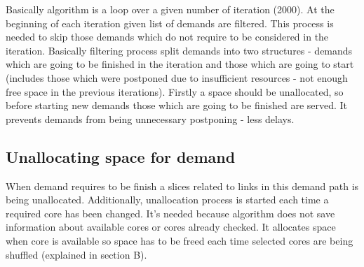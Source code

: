 \documentclass[conference]{IEEEtran}
\begin{document}
Basically algorithm is a loop over a given number of iteration (2000). At the beginning of each iteration given list of demands are filtered. This process is needed to skip those demands which do not require to be considered in the iteration. Basically filtering process split demands into two structures - demands which are going to be finished in the iteration and those which are going to start (includes those which were postponed due to insufficient resources - not enough free space in the previous iterations). Firstly a space should be unallocated, so before starting new demands those which are going to be finished are served. It prevents demands from being unnecessary postponing - less delays.
\subsection{Unallocating space for demand}
When demand requires to be finish a slices related to links in this demand path is being unallocated.
Additionally, unallocation process is started each time a required core has been changed. It's needed because algorithm does not save information about available cores or cores already checked. It allocates space when core is available so space has to be freed each time selected cores are being shuffled (explained in section B).
\end{document}
